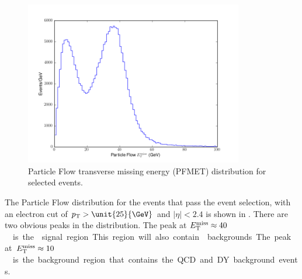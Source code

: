 \begin{figure}[htbp]
  \begin{center}
    \includegraphics*[width=0.85\textwidth]{pfmet_dist}
    \caption{Particle Flow transverse missing energy (PFMET) distribution for selected events.}
  \label{fig:pfmet}
  \end{center}
\end{figure}

The Particle Flow \ETm distribution for the events that pass the event
selection, with an electron cut of $\PT > \unit{25}{\GeV}$ and $|\eta| < 2.4$ is
shown in . There are two obvious peaks in the
distribution. The peak at \unit{$E_{\mathrm{T}}^{\text{miss}} \approx 40$}{\GeV} is the
\HepProcess{\PW\to\Pelectron\Pnue} signal region. This region will also contain
\HepProcess{\PW\to\Ptau\Pnut} backgrounds. The peak at
\unit{$E_{\mathrm{T}}^{\text{miss}}\approx 10$}{\GeV} is the background region that contains the \ac{QCD}
and \ac{DY} background events.

